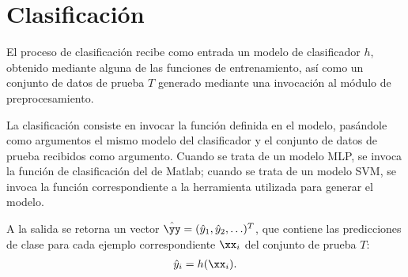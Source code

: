 %
%
%
\section{Clasificación}
%
El proceso de clasificación recibe como entrada un modelo de
clasificador $h$, obtenido mediante alguna de las funciones de
entrenamiento, así como un conjunto de datos de prueba $T$ generado
mediante una invocación al módulo de preprocesamiento.

La clasificación consiste en invocar la función definida en el modelo,
pasándole como argumentos el mismo modelo del clasificador y el
conjunto de datos de prueba recibidos como argumento.
Cuando se trata de un modelo MLP, se invoca la función de
clasificación del  de Matlab; cuando se
trata de un modelo SVM, se invoca la función correspondiente a la
herramienta utilizada para generar el modelo.

A la salida se retorna un vector $\hat{\yy}=(\hat{y}_1,\hat{y}_2,\ldots)^T$,
que contiene las predicciones de clase para cada ejemplo
correspondiente $\xx_i$ del conjunto de prueba $T$:
%
\begin{align*}
  \hat{y}_i = h(\xx_i).
\end{align*}
%
